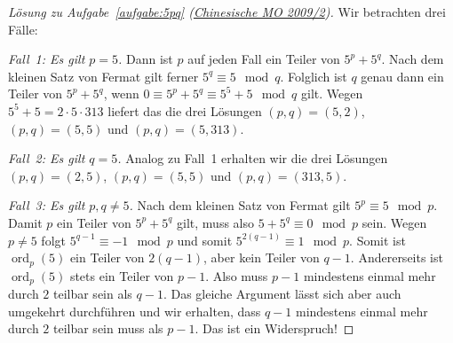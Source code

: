\begin{proof}[Lösung zu Aufgabe~\ref{aufgabe:5pq} \textmd{(\href{https://artofproblemsolving.com/community/c5232_2009_china_national_olympiad}{Chinesische MO 2009/2})}]
	Wir betrachten drei Fälle:
	
	\emph{Fall~1: Es gilt $p=5$.} Dann ist $p$ auf jeden Fall ein Teiler von $5^p+5^q$. Nach dem kleinen Satz von Fermat gilt ferner $5^q\equiv 5\mod q$. Folglich ist $q$ genau dann ein Teiler von $5^p+5^q$, wenn $0\equiv 5^p+5^q\equiv 5^5+5\mod q$ gilt. Wegen $5^5+5=2\cdot 5\cdot 313$ liefert das die drei Lösungen $(p,q)=(5,2)$, $(p,q)=(5,5)$ und $(p,q)=(5,313)$.
	
	\emph{Fall~2: Es gilt $q=5$.} Analog zu Fall~1 erhalten wir die drei Lösungen $(p,q)=(2,5)$, $(p,q)=(5,5)$ und $(p,q)=(313,5)$.
	
	\emph{Fall~3: Es gilt $p,q\neq 5$.} Nach dem kleinen Satz von Fermat gilt $5^p\equiv 5\mod p$. Damit $p$ ein Teiler von $5^p+5^q$ gilt, muss also $5+5^q\equiv 0\mod p$ sein. Wegen $p\neq 5$ folgt $5^{q-1}\equiv -1\mod p$ und somit $5^{2(q-1)}\equiv 1\mod p$. Somit ist $\operatorname{ord}_p(5)$ ein Teiler von $2(q-1)$, aber kein Teiler von $q-1$. Andererseits ist $\operatorname{ord}_p(5)$ stets ein Teiler von $p-1$. Also muss $p-1$ mindestens einmal mehr durch $2$ teilbar sein als $q-1$. Das gleiche Argument lässt sich aber auch umgekehrt durchführen und wir erhalten, dass $q-1$ mindestens einmal mehr durch $2$ teilbar sein muss als $p-1$. Das ist ein Widerspruch!
\end{proof}


